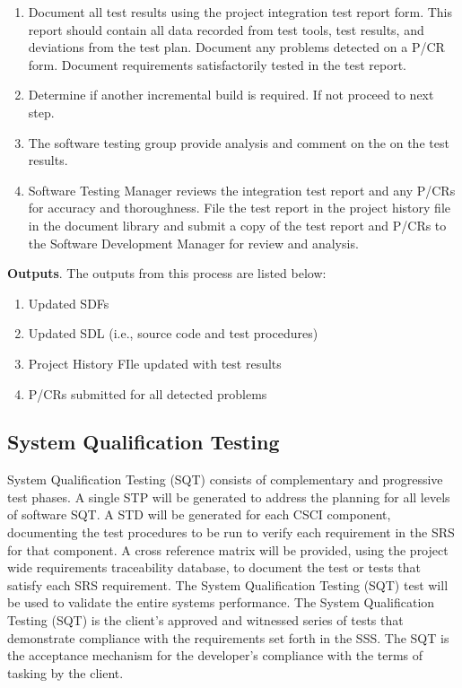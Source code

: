 \documentclass[a4paper, 11pt]{article}
\begin{document}
\begin{enumerate}
	\item Document all test results using the project integration test report form. This report should	contain all data recorded from test tools, test results, and deviations from the test plan.	Document any problems detected on a P/CR form. Document requirements satisfactorily tested in the test report.
	\item Determine if another incremental build is required. If not proceed to next step.
	\item The software testing group provide analysis and comment on the on the test results.
	\item Software Testing Manager reviews the integration test report and any P/CRs for accuracy and thoroughness. File the test report in the project history file in the document library and submit a copy of the test report and P/CRs to the Software Development Manager for review and analysis.
\end{enumerate}

\textbf{Outputs}. The outputs from this process are listed below:
\begin{enumerate}
	\item Updated SDFs
	\item Updated SDL (i.e., source code and test procedures)
	\item Project History FIle updated with test results
	\item P/CRs submitted for all detected problems
\end{enumerate}

\subsection{System Qualification Testing}
System Qualification Testing (SQT) consists of complementary and progressive test phases. A single STP will be generated to address the planning for all levels of software SQT. A STD will be generated for each CSCI component, documenting the test procedures to be run to verify
each requirement in the SRS for that component. A cross reference matrix will be provided, using the project wide requirements traceability database, to document the test or tests that satisfy each SRS requirement.
The System Qualification Testing (SQT) test will be used to validate the entire systems performance. The System Qualification Testing (SQT) is the client's approved and witnessed series of tests that demonstrate compliance with the requirements set forth in the SSS. The SQT is the acceptance mechanism for the developer's compliance with the terms of tasking by the client.
\end{document}
